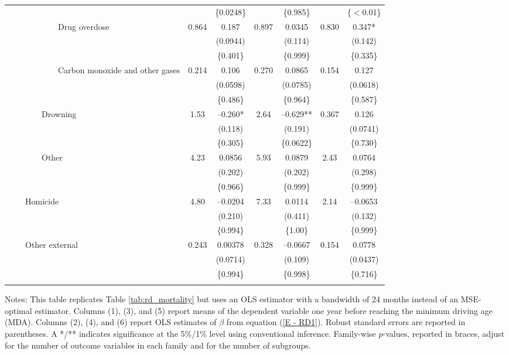 \documentclass{article}
\begin{document}
\begin{table}[tbp]
{\begin{tabularx}{\linewidth}{lCcCcCc}
&&\{0.0248\}&&\{0.985\}&&\{\(<\)0.01\} \tabularnewline
\addlinespace[1ex] \ \ \ \ \ \ \ \ \ \ \ \ Drug overdose&0.864&0.187&0.897&0.0345&0.830&0.347* \tabularnewline
&&(0.0944)&&(0.114)&&(0.142) \tabularnewline
&&\{0.401\}&&\{0.999\}&&\{0.335\} \tabularnewline
\addlinespace[1ex] \ \ \ \ \ \ \ \ \ \ \ \ Carbon monoxide and other gases&0.214&0.106&0.270&0.0865&0.154&0.127 \tabularnewline
&&(0.0598)&&(0.0785)&&(0.0618) \tabularnewline
&&\{0.486\}&&\{0.964\}&&\{0.587\} \tabularnewline
\addlinespace[1ex] \ \ \ \ \ \ \ \ Drowning&1.53&--0.260*&2.64&--0.629**&0.367&0.126 \tabularnewline
&&(0.118)&&(0.191)&&(0.0741) \tabularnewline
&&\{0.305\}&&\{0.0622\}&&\{0.730\} \tabularnewline
\addlinespace[1ex] \ \ \ \ \ \ \ \ Other&4.23&0.0856&5.93&0.0879&2.43&0.0764 \tabularnewline
&&(0.202)&&(0.202)&&(0.298) \tabularnewline
&&\{0.966\}&&\{0.999\}&&\{0.999\} \tabularnewline
\addlinespace[1ex] \ \ \ \ Homicide&4.80&--0.0204&7.33&0.0114&2.14&--0.0653 \tabularnewline
&&(0.210)&&(0.411)&&(0.132) \tabularnewline
&&\{0.994\}&&\{1.00\}&&\{0.999\} \tabularnewline
\addlinespace[1ex] \ \ \ \ Other external&0.243&0.00378&0.328&--0.0667&0.154&0.0778 \tabularnewline
&&(0.0714)&&(0.109)&&(0.0437) \tabularnewline
&&\{0.994\}&&\{0.998\}&&\{0.716\} \tabularnewline
\bottomrule \addlinespace[\belowrulesep]

\end{tabularx}
\begin{flushleft}
\scriptsize Notes: This table replicates Table \ref{tab:rd_mortality} but uses an OLS estimator with a bandwidth of 24 months instead of an MSE-optimal estimator. Columns (1), (3), and (5) report means of the dependent variable one year before reaching the minimum driving age (MDA). Columns (2), (4), and (6) report OLS estimates of \(\beta\) from equation (\ref{E - RD1}). Robust standard errors are reported in parentheses.  A */** indicates significance at the 5\%/1\% level using conventional inference. Family-wise \(p\)-values, reported in braces, adjust for the number of outcome variables in each family and for the number of subgroups.
\end{flushleft}
}
\end{table}
\end{document}
